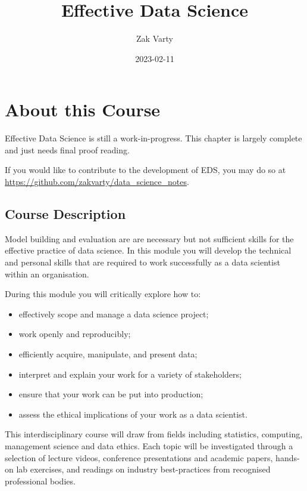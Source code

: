 \documentclass[
  12pt,
]{book}
\title{Effective Data Science}
\author{Zak Varty}
\date{2023-02-11}
\providecommand{\tightlist}{%
  \setlength{\itemsep}{0pt}\setlength{\parskip}{0pt}}
\begin{document}
\maketitle

{
\setcounter{tocdepth}{1}
\tableofcontents
}
\hypertarget{about-this-course}{%
\chapter*{About this Course}\label{about-this-course}}

Effective Data Science is still a work-in-progress. This chapter is largely complete and just needs final proof reading.

If you would like to contribute to the development of EDS, you may do so at \url{https://github.com/zakvarty/data_science_notes}.

\hypertarget{course-description}{%
\section*{Course Description}\label{course-description}}

Model building and evaluation are are necessary but not sufficient skills for the effective practice of data science. In this module you will develop the technical and personal skills that are required to work successfully as a data scientist within an organisation.

During this module you will critically explore how to:

\begin{itemize}
\tightlist
\item
  effectively scope and manage a data science project;
\item
  work openly and reproducibly;
\item
  efficiently acquire, manipulate, and present data;
\item
  interpret and explain your work for a variety of stakeholders;
\item
  ensure that your work can be put into production;
\item
  assess the ethical implications of your work as a data scientist.
\end{itemize}

This interdisciplinary course will draw from fields including statistics, computing, management science and data ethics. Each topic will be investigated through a selection of lecture videos, conference presentations and academic papers, hands-on lab exercises, and readings on industry best-practices from recognised professional bodies.
\end{document}
